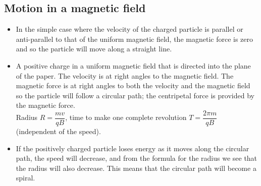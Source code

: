\documentclass[a4paper,12pt]{article}
\begin{document}
\subsection{Motion in a magnetic field}
\begin{itemize}
  \item In the simple case where the velocity of the charged particle is parallel or anti-parallel to that of the uniform magnetic field, the magnetic force is zero and so the particle will move along a straight line.
  \item A positive charge in a uniform magnetic field that is directed into the plane of the paper. The velocity is at right angles to the magnetic field. The magnetic force is at right angles to both the velocity and the magnetic field so the particle will follow a circular path; the centripetal force is provided by the magnetic force.\\
  Radius $R=\dfrac{mv}{qB}$, time to make one complete revolution $T=\dfrac{2\pi m}{qB}$ (independent of the speed).
  \item If the positively charged particle loses energy as it moves along the circular path, the speed will decrease, and from the formula for the radius we see that the radius will also decrease. This means that the circular path will become a spiral.
\end{itemize}
\end{document}
